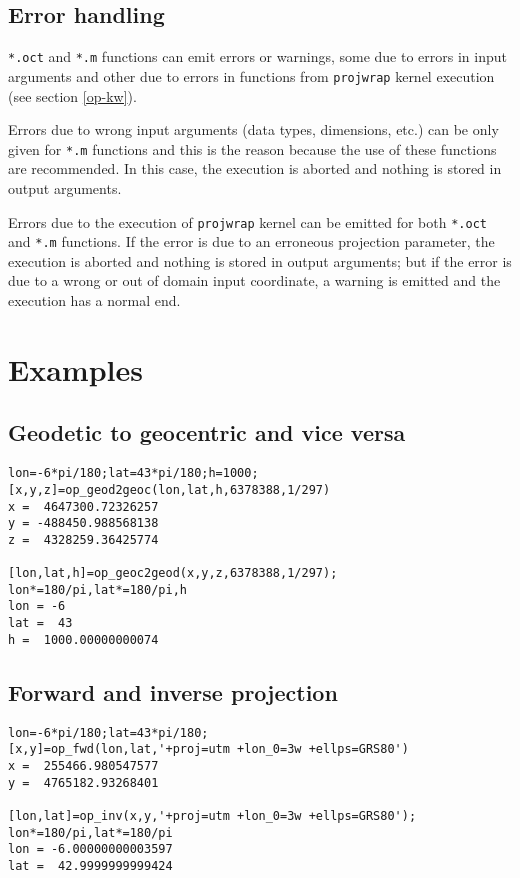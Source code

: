 \documentclass[10pt,a4paper]{article}
\begin{document}
\subsection{Error handling}

\texttt{*.oct} and \texttt{*.m} functions can emit errors or warnings, some due
to errors in input arguments and other due to errors in functions from
\texttt{projwrap} kernel execution (see section \ref{op-kw}).

Errors due to wrong input arguments (data types, dimensions, etc.) can be only
given for \texttt{*.m} functions and this is the reason because the use of these
functions are recommended. In this case, the execution is aborted and nothing is
stored in output arguments.

Errors due to the execution of \texttt{projwrap} kernel can be emitted for both
\texttt{*.oct} and \texttt{*.m} functions. If the error is due to an erroneous
projection parameter, the execution is aborted and nothing is stored in output
arguments; but if the error is due to a wrong or out of domain input coordinate,
a warning is emitted and the execution has a normal end.

\section{Examples}

\subsection{Geodetic to geocentric and vice versa}

\begin{verbatim}
lon=-6*pi/180;lat=43*pi/180;h=1000;
[x,y,z]=op_geod2geoc(lon,lat,h,6378388,1/297)
x =  4647300.72326257
y = -488450.988568138
z =  4328259.36425774

[lon,lat,h]=op_geoc2geod(x,y,z,6378388,1/297);
lon*=180/pi,lat*=180/pi,h
lon = -6
lat =  43
h =  1000.00000000074
\end{verbatim}

\subsection{Forward and inverse projection}

\begin{verbatim}
lon=-6*pi/180;lat=43*pi/180;
[x,y]=op_fwd(lon,lat,'+proj=utm +lon_0=3w +ellps=GRS80')
x =  255466.980547577
y =  4765182.93268401

[lon,lat]=op_inv(x,y,'+proj=utm +lon_0=3w +ellps=GRS80');
lon*=180/pi,lat*=180/pi
lon = -6.00000000003597
lat =  42.9999999999424
\end{verbatim}
\end{document}
